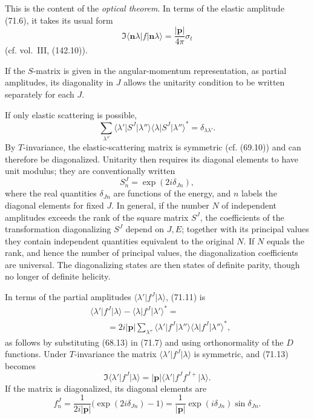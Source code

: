 This is the content of the \emph{optical theorem}. In terms of the elastic amplitude (71.6), it takes its usual form
\begin{equation}
\Im\langle\mathbf n\lambda\vert f\vert\mathbf n\lambda\rangle
=\frac{\lvert\mathbf p\rvert}{4\pi}\sigma_t
\tag{71.10}
\end{equation}
(cf. vol.~III, (142.10)).

If the $S$-matrix is given in the angular-momentum representation, as partial amplitudes, its diagonality in $J$ allows the unitarity condition to be written separately for each $J$.

If only elastic scattering is possible,
\begin{equation}
\sum_{\lambda''}\langle\lambda'\vert S^J\vert\lambda''\rangle
\langle\lambda\vert S^J\vert\lambda''\rangle^*=\delta_{\lambda\lambda'}.
\tag{71.11}
\end{equation}
By $T$-invariance, the elastic-scattering matrix is symmetric (cf. (69.10)) and can therefore be diagonalized. Unitarity then requires its diagonal elements to have unit modulus; they are conventionally written
\begin{equation}
S_n^J=\exp(2i\delta_{Jn}),
\tag{71.12}
\end{equation}
where the real quantities $\delta_{Jn}$ are functions of the energy, and $n$ labels the diagonal elements for fixed $J$. In general, if the number $N$ of independent amplitudes exceeds the rank of the square matrix $S^J$, the coefficients of the transformation diagonalizing $S^J$ depend on $J,E$; together with its principal values they contain independent quantities equivalent to the original $N$. If $N$ equals the rank, and hence the number of principal values, the diagonalization coefficients are universal. The diagonalizing states are then states of definite parity, though no longer of definite helicity.

In terms of the partial amplitudes $\langle\lambda'\vert f^J\vert\lambda\rangle$, (71.11) is
\begin{equation}
\begin{aligned}
&\langle\lambda'\vert f^J\vert\lambda\rangle
-\langle\lambda\vert f^J\vert\lambda'\rangle^*={}\\
&\qquad=2i\lvert\mathbf p\rvert\sum_{\lambda''}
\langle\lambda'\vert f^J\vert\lambda''\rangle
\langle\lambda\vert f^J\vert\lambda''\rangle^*,
\end{aligned}
\tag{71.13}
\end{equation}
as follows by substituting (68.13) in (71.7) and using orthonormality of the $D$ functions. Under $T$-invariance the matrix $\langle\lambda'\vert f^J\vert\lambda\rangle$ is symmetric, and (71.13) becomes
\begin{equation}
\Im\langle\lambda'\vert f^J\vert\lambda\rangle
=\lvert\mathbf p\rvert\langle\lambda'\vert f^Jf^{J+}\vert\lambda\rangle.
\tag{71.14}
\end{equation}
If the matrix is diagonalized, its diagonal elements are
\begin{equation}
f_n^J=\frac{1}{2i\lvert\mathbf p\rvert}\bigl(\exp(2i\delta_{Jn})-1\bigr)
=\frac{1}{\lvert\mathbf p\rvert}\exp(i\delta_{Jn})\sin\delta_{Jn}.
\tag{71.15}
\end{equation}

